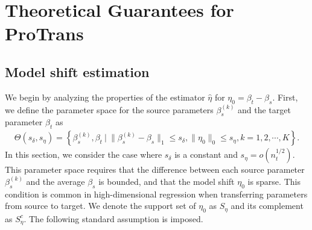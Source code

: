 \documentclass[12pt]{article}
\newtheorem{assump}{Assumption}
\begin{document}
\section{Theoretical Guarantees for ProTrans}
\label{sec:theorem}
\subsection{Model shift estimation}

We begin by analyzing the properties of the estimator $\hat{\eta}$ for $\eta_0 = \beta_t - \beta_s$. First, we define the parameter space for the source parameters $\beta_s^{(k)}$ and the target parameter $\beta_t$ as 
\begin{align*}
    \Theta(s_\delta,s_\eta) = \left\{\beta_s^{(k)},\beta_t\ \big|\ \|\beta_s^{(k)} - \beta_s\|_1 \le s_\delta, \|\eta_0\|_0\le s_\eta, k=1,2,\cdots,K\right\}. 
\end{align*}
In this section, we consider the case where $s_\delta$ is a constant and $s_\eta = o(n_t^{1/2})$. 
This parameter space requires that the difference between each source parameter $\beta_s^{(k)}$ and the average $\beta_s$ is bounded, and that the model shift $\eta_0$ is sparse. This condition is common in high-dimensional regression when transferring parameters from source to target. We denote the support set of $\eta_0$ as $S_\eta$ and its complement as $S_\eta^c$. The following standard assumption is imposed.

 
\end{document}
